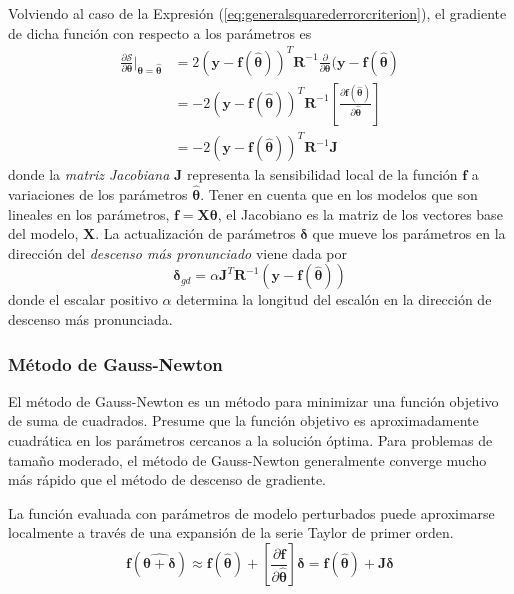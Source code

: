Volviendo al caso de la Expresión (\ref{eq:generalsquarederrorcriterion}), el gradiente de dicha función con respecto a los parámetros es
\begin{align}
    \frac{\partial \mathscr{S}}{\partial \bm{\theta}}\bigg\rvert_{\bm{\theta}=\hat{\bm{\theta}}} &= 2(\bm{y} - \bm{f}(\hat{\bm{\theta}}))^T \bm{R}^{-1}\frac{\partial}{\partial \bm{\theta}}(\bm{y} - \bm{f}(\hat{\bm{\theta}}) \\
    &= -2(\bm{y} - \bm{f}(\hat{\bm{\theta}}))^T \bm{R}^{-1}\left[\frac{\partial \bm{f}(\hat{\bm{\theta}})}{\partial \hat{\bm{\theta}}}\right] \\
    &= -2(\bm{y} - \bm{f}(\hat{\bm{\theta}}))^T \bm{R}^{-1}\bm{J}
\end{align}
donde la \textit{matriz Jacobiana} $\bm{J}$ representa la sensibilidad local de la función $\bm{f}$ a variaciones de los parámetros $\hat{\bm{\theta}}$. Tener en cuenta que en los modelos que son lineales en los parámetros, $\bm{f} = \bm{X}\bm{\theta}$, el Jacobiano es la matriz de los vectores base del modelo, $\bm{X}$. La actualización de parámetros $\bm{\delta}$ que mueve los parámetros en la dirección del \textit{descenso más pronunciado} viene dada por
\begin{equation}
    \bm{\delta}_{gd} = \alpha\bm{J}^T\bm{R}^{-1}(\bm{y} - \bm{f}(\hat{\bm{\theta}}))
\end{equation}
donde el escalar positivo $\alpha$ determina la longitud del escalón en la dirección de descenso más pronunciada.

\subsubsection{Método de Gauss-Newton}
El método de Gauss-Newton es un método para minimizar una función objetivo de suma de cuadrados. Presume que la función objetivo es aproximadamente cuadrática en los parámetros cercanos a la solución óptima. Para problemas de tamaño moderado, el método de Gauss-Newton generalmente converge mucho más rápido que el método de descenso de gradiente.

La función evaluada con parámetros de modelo perturbados puede aproximarse localmente a través de una expansión de la serie Taylor de primer orden.
\begin{equation}
    \bm{f}(\hat{\bm{\theta}+\bm{\delta}}) \approx \bm{f}(\hat{\bm{\theta}}) + \left[\frac{\partial \bm{f}}{\partial \hat{\bm{\theta}}}\right]\bm{\delta} = \bm{f}(\hat{\bm{\theta}}) + \bm{J}\bm{\delta}
    \label{eq:gaussnewtontaylor}
\end{equation}


